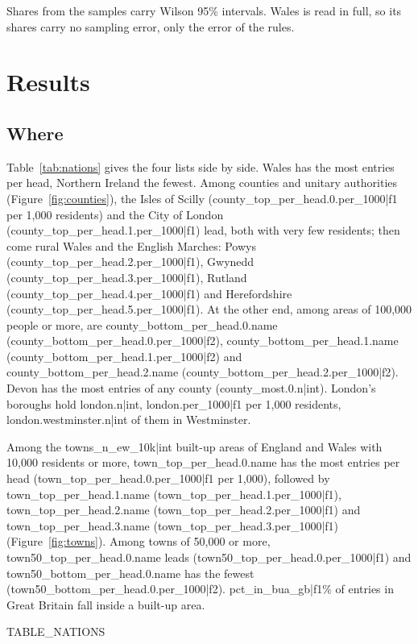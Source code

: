 \documentclass[11pt,a4paper]{article}
\begin{document}
Shares from the samples carry Wilson 95\% intervals. Wales is read in full, so its shares carry no sampling error, only the error of the rules.

\section{Results}

\subsection{Where}

Table~\ref{tab:nations} gives the four lists side by side. Wales has the most entries per head, Northern Ireland the fewest. Among counties and unitary authorities (Figure~\ref{fig:counties}), the Isles of Scilly ({{county_top_per_head.0.per_1000|f1}} per 1,000 residents) and the City of London ({{county_top_per_head.1.per_1000|f1}}) lead, both with very few residents; then come rural Wales and the English Marches: Powys ({{county_top_per_head.2.per_1000|f1}}), Gwynedd ({{county_top_per_head.3.per_1000|f1}}), Rutland ({{county_top_per_head.4.per_1000|f1}}) and Herefordshire ({{county_top_per_head.5.per_1000|f1}}). At the other end, among areas of 100,000 people or more, are {{county_bottom_per_head.0.name}} ({{county_bottom_per_head.0.per_1000|f2}}), {{county_bottom_per_head.1.name}} ({{county_bottom_per_head.1.per_1000|f2}}) and {{county_bottom_per_head.2.name}} ({{county_bottom_per_head.2.per_1000|f2}}). Devon has the most entries of any county ({{county_most.0.n|int}}). London's boroughs hold {{london.n|int}}, {{london.per_1000|f1}} per 1,000 residents, {{london.westminster.n|int}} of them in Westminster.

Among the {{towns_n_ew_10k|int}} built-up areas of England and Wales with 10,000 residents or more, {{town_top_per_head.0.name}} has the most entries per head ({{town_top_per_head.0.per_1000|f1}} per 1,000), followed by {{town_top_per_head.1.name}} ({{town_top_per_head.1.per_1000|f1}}), {{town_top_per_head.2.name}} ({{town_top_per_head.2.per_1000|f1}}) and {{town_top_per_head.3.name}} ({{town_top_per_head.3.per_1000|f1}}) (Figure~\ref{fig:towns}). Among towns of 50,000 or more, {{town50_top_per_head.0.name}} leads ({{town50_top_per_head.0.per_1000|f1}}) and {{town50_bottom_per_head.0.name}} has the fewest ({{town50_bottom_per_head.0.per_1000|f2}}). {{pct_in_bua_gb|f1}}\% of entries in Great Britain fall inside a built-up area.

{{TABLE_NATIONS}}
\end{document}
